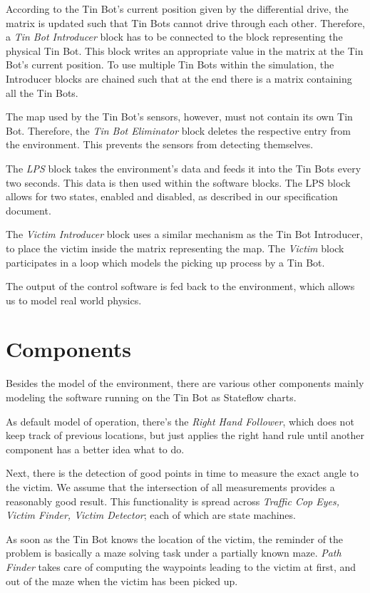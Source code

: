 \documentclass[a4paper,parskip,headheight=38pt]{scrartcl} %
\begin{document}
According to the Tin Bot's current position given by the differential drive, the matrix is updated such that Tin Bots cannot drive through each other. Therefore, a \emph{Tin Bot Introducer} block has to be connected to the block representing the physical Tin Bot. This block writes an appropriate value in the matrix at the Tin Bot's current position. To use multiple Tin Bots within the simulation, the Introducer blocks are chained such that at the end there is a matrix containing all the Tin Bots.

The map used by the Tin Bot's sensors, however, must not contain its own Tin Bot. Therefore, the \emph{Tin Bot Eliminator} block deletes the respective entry from the environment. This prevents the sensors from detecting themselves.

The \emph{LPS} block takes the environment's data and feeds it into the Tin Bots every two seconds. This data is then used within the software blocks. The LPS block allows for two states, enabled and disabled, as described in our specification document.

The \emph{Victim Introducer} block uses a similar mechanism as the Tin Bot Introducer, to place the victim inside the matrix representing the map. The \emph{Victim} block participates in a loop which models the picking up process by a Tin Bot.

The output of the control software is fed back to the environment, which allows us to model real world physics.

\section{Components}
Besides the model of the environment, there are various other components mainly modeling the software running on the Tin Bot as Stateflow charts.

As default model of operation, there's the \emph{Right Hand Follower}, which does not keep track of previous locations, but just applies the right hand rule until another component has a better idea what to do.

Next, there is the detection of good points in time to measure the exact angle to the victim.  We assume that the intersection of all measurements provides a reasonably good result.  This functionality is spread across \emph{Traffic Cop Eyes, Victim Finder, Victim Detector}; each of which are state machines.

As soon as the Tin Bot knows the location of the victim, the reminder of the problem is basically a maze solving task under a partially known maze. 
\emph{Path Finder} takes care of computing the waypoints leading to the victim at first, and out of the maze when the victim has been picked up. 
\end{document}
